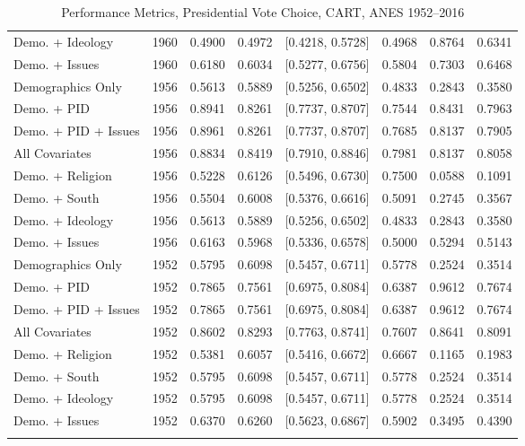 \begin{longtable}{lrrrlrrr}
  Demo. + Ideology & 1960 & 0.4900 & 0.4972 & [0.4218, 0.5728] & 0.4968 & 0.8764 & 0.6341 \\ 
  Demo. + Issues & 1960 & 0.6180 & 0.6034 & [0.5277, 0.6756] & 0.5804 & 0.7303 & 0.6468 \\ 
  Demographics Only & 1956 & 0.5613 & 0.5889 & [0.5256, 0.6502] & 0.4833 & 0.2843 & 0.3580 \\ 
  Demo. + PID & 1956 & 0.8941 & 0.8261 & [0.7737, 0.8707] & 0.7544 & 0.8431 & 0.7963 \\ 
  Demo. + PID + Issues & 1956 & 0.8961 & 0.8261 & [0.7737, 0.8707] & 0.7685 & 0.8137 & 0.7905 \\ 
  All Covariates & 1956 & 0.8834 & 0.8419 & [0.7910, 0.8846] & 0.7981 & 0.8137 & 0.8058 \\ 
  Demo. + Religion & 1956 & 0.5228 & 0.6126 & [0.5496, 0.6730] & 0.7500 & 0.0588 & 0.1091 \\ 
  Demo. + South & 1956 & 0.5504 & 0.6008 & [0.5376, 0.6616] & 0.5091 & 0.2745 & 0.3567 \\ 
  Demo. + Ideology & 1956 & 0.5613 & 0.5889 & [0.5256, 0.6502] & 0.4833 & 0.2843 & 0.3580 \\ 
  Demo. + Issues & 1956 & 0.6163 & 0.5968 & [0.5336, 0.6578] & 0.5000 & 0.5294 & 0.5143 \\ 
  Demographics Only & 1952 & 0.5795 & 0.6098 & [0.5457, 0.6711] & 0.5778 & 0.2524 & 0.3514 \\ 
  Demo. + PID & 1952 & 0.7865 & 0.7561 & [0.6975, 0.8084] & 0.6387 & 0.9612 & 0.7674 \\ 
  Demo. + PID + Issues & 1952 & 0.7865 & 0.7561 & [0.6975, 0.8084] & 0.6387 & 0.9612 & 0.7674 \\ 
  All Covariates & 1952 & 0.8602 & 0.8293 & [0.7763, 0.8741] & 0.7607 & 0.8641 & 0.8091 \\ 
  Demo. + Religion & 1952 & 0.5381 & 0.6057 & [0.5416, 0.6672] & 0.6667 & 0.1165 & 0.1983 \\ 
  Demo. + South & 1952 & 0.5795 & 0.6098 & [0.5457, 0.6711] & 0.5778 & 0.2524 & 0.3514 \\ 
  Demo. + Ideology & 1952 & 0.5795 & 0.6098 & [0.5457, 0.6711] & 0.5778 & 0.2524 & 0.3514 \\ 
  Demo. + Issues & 1952 & 0.6370 & 0.6260 & [0.5623, 0.6867] & 0.5902 & 0.3495 & 0.4390 \\ 
   \bottomrule
\caption{Performance Metrics, Presidential Vote Choice, CART, ANES 1952--2016} 
\label{tab:ANES_prezvote_cart}
\end{longtable}
